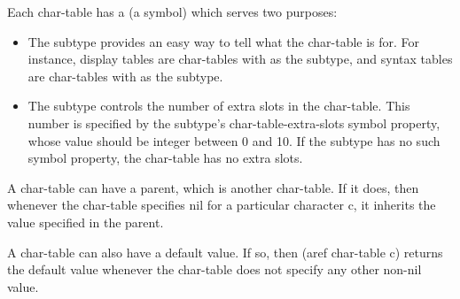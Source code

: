 Each char-table has a  (a symbol) which serves two purposes:
\begin{itemize}
\item The subtype provides an easy way to tell what the char-table is for.
  For instance, display tables are char-tables with  as the subtype, and syntax tables are char-tables with  as the subtype.
\item The subtype controls the number of extra slots in the char-table.
  This number is specified by the subtype’s char-table-extra-slots symbol property, whose value should be integer between 0 and 10.
  If the subtype has no such symbol property, the char-table has no extra slots.
\end{itemize}


A char-table can have a parent, which is another char-table.
If it does, then whenever the char-table specifies nil for a particular character c, it inherits the value specified in the parent.

A char-table can also have a default value.
If so, then (aref char-table c) returns the default value whenever the char-table does not specify any other non-nil value.


